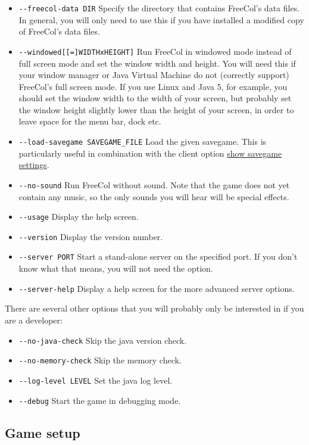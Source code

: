 \documentclass[12pt]{book}
\begin{document}
\begin{itemize}
\item\verb$--freecol-data DIR$ Specify the directory that contains
FreeCol's data files. In general, you will only need to use this if
you have installed a modified copy of FreeCol's data files.
\item\verb$--windowed[[=]WIDTHxHEIGHT]$ Run FreeCol in windowed mode
instead of full screen mode and set the window width and height. You
will need this if your window manager or Java Virtual Machine do not
(correctly support) FreeCol's full screen mode. If you use Linux and
Java 5, for example, you should set the window width to the width of
your screen, but probably set the window height slightly lower than
the height of your screen, in order to leave space for the menu bar,
dock etc.
\item\verb$--load-savegame SAVEGAME_FILE$ Load the given
savegame. This is particularly useful in combination with the client
option \hyperlink{show savegame settings}{show savegame settings}.
\item\verb$--no-sound$ Run FreeCol without sound. Note that the game
does not yet contain any music, so the only sounds you will hear will
be special effects.
\item\verb$--usage$ Display the help screen.
\item\verb$--version$ Display the version number.
\item\verb$--server PORT$ Start a stand-alone server on the specified
port. If you don't know what that means, you will not need the option.
\item\verb$--server-help$ Display a help screen for the more advanced
server options.
\end{itemize}

There are several other options that you will probably only be
interested in if you are a developer:

\begin{itemize}
\item\verb$--no-java-check$ Skip the java version check.
\item\verb$--no-memory-check$ Skip the memory check.
\item\verb$--log-level LEVEL$ Set the java log level.
\item\verb$--debug$ Start the game in debugging mode.
\end{itemize}


\hypertarget{Game setup}{\subsection{Game setup}}
\end{document}
